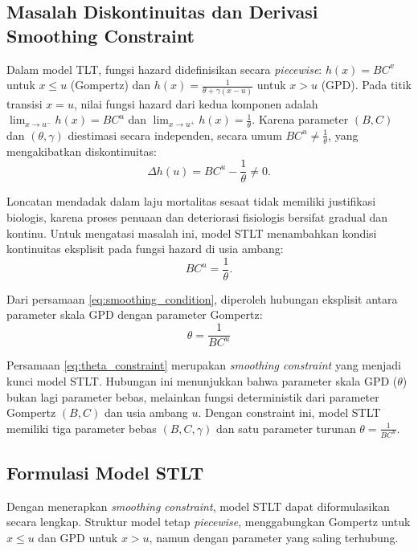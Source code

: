 \subsection{Masalah Diskontinuitas dan Derivasi Smoothing Constraint}

Dalam model TLT, fungsi hazard didefinisikan secara \textit{piecewise}: $h(x) = BC^x$ untuk $x \leq u$ (Gompertz) dan $h(x) = \frac{1}{\theta + \gamma(x-u)}$ untuk $x > u$ (GPD). Pada titik transisi $x = u$, nilai fungsi hazard dari kedua komponen adalah $\lim_{x \to u^-} h(x) = BC^u$ dan $\lim_{x \to u^+} h(x) = \frac{1}{\theta}$. Karena parameter $(B, C)$ dan $(\theta, \gamma)$ diestimasi secara independen, secara umum $BC^u \neq \frac{1}{\theta}$, yang mengakibatkan diskontinuitas:
\begin{equation}
\Delta h(u) = BC^u - \frac{1}{\theta} \neq 0.
\label{eq:stlt_hazard_discontinuity}
\end{equation}

Loncatan mendadak dalam laju mortalitas sesaat tidak memiliki justifikasi biologis, karena proses penuaan dan deteriorasi fisiologis bersifat gradual dan kontinu. Untuk mengatasi masalah ini, model STLT menambahkan kondisi kontinuitas eksplisit pada fungsi hazard di usia ambang:
\begin{equation}
BC^u = \frac{1}{\theta}.
\label{eq:smoothing_condition}
\end{equation}

Dari persamaan \eqref{eq:smoothing_condition}, diperoleh hubungan eksplisit antara parameter skala GPD dengan parameter Gompertz:
\begin{equation}
\boxed{\theta = \frac{1}{BC^u}}
\label{eq:theta_constraint}
\end{equation}

Persamaan \eqref{eq:theta_constraint} merupakan \textit{smoothing constraint} yang menjadi kunci model STLT. Hubungan ini menunjukkan bahwa parameter skala GPD ($\theta$) bukan lagi parameter bebas, melainkan fungsi deterministik dari parameter Gompertz $(B, C)$ dan usia ambang $u$. Dengan constraint ini, model STLT memiliki tiga parameter bebas $(B, C, \gamma)$ dan satu parameter turunan $\theta = \frac{1}{BC^u}$.

\subsection{Formulasi Model STLT}

Dengan menerapkan \textit{smoothing constraint}, model STLT dapat diformulasikan secara lengkap. Struktur model tetap \textit{piecewise}, menggabungkan Gompertz untuk $x \leq u$ dan GPD untuk $x > u$, namun dengan parameter yang saling terhubung.

